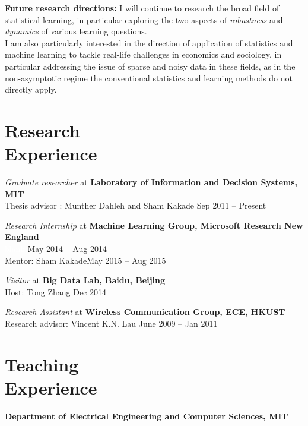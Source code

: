 \documentclass[margin,line,11pt]{resume}
\begin{document}
\begin{resume}
  \vspace{-6pt}

  \textbf{Future research directions:} I will continue to research the broad field of
  statistical learning, in particular exploring the two aspects of \emph{robustness} and
  \emph{dynamics} of various learning questions.
  \\
  I am also particularly interested in the direction of application of statistics and
  machine learning to tackle real-life challenges in economics and sociology, in
  particular addressing the issue of sparse and noisy data in these fields, as in the
  non-asymptotic regime the conventional statistics and learning methods do not directly
  apply.


  \section{\mysidestyle Research\\Experience }

  \textsl{Graduate researcher} at
  \textbf{Laboratory of Information and Decision Systems, MIT}
  \\
  Thesis advisor : Munther Dahleh and Sham Kakade \hfill {Sep 2011 -- Present}

  \vspace{-6pt}

  \textsl{Research Internship} at \textbf{Machine Learning Group, Microsoft Research New
    England}
  \\
  \textcolor{white}{blank} \hfill {May 2014 -- Aug 2014}
  \\
  Mentor: Sham Kakade\hfill {May 2015 -- Aug 2015}

  \vspace{-6pt}

  \textsl{Visitor} at \textbf{Big Data Lab, Baidu, Beijing}
  \\
  Host: Tong Zhang \hfill {Dec 2014}

  \vspace{-6pt}

  \textsl{Research Assistant} at \textbf{Wireless Communication Group, ECE, HKUST}
  \\
  Research advisor: Vincent K.N. Lau \hfill {June 2009 -- Jan 2011}



\newpage

\section{\mysidestyle Teaching \\ Experience}
\textbf{Department of Electrical Engineering and Computer Sciences, MIT}
\vspace{-3mm}


\end{resume}
\end{document}
